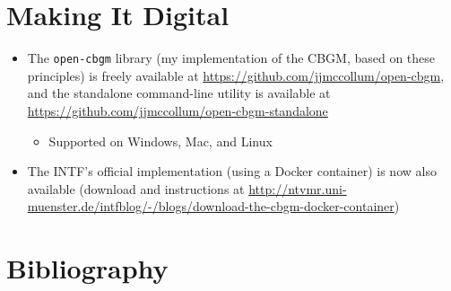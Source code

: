 \documentclass[10pt]{beamer}
\begin{document}
	\section*{Making It Digital}
	\begin{frame}
		\begin{itemize}
			\item The \texttt{open-cbgm} library (my implementation of the CBGM, based on these principles) is freely available at \url{https://github.com/jjmccollum/open-cbgm}, and the standalone command-line utility is available at \url{https://github.com/jjmccollum/open-cbgm-standalone}
			\begin{itemize}
				\item Supported on Windows, Mac, and Linux
			\end{itemize}
			\item The INTF's official implementation (using a Docker container) is now also available (download and instructions at \url{http://ntvmr.uni-muenster.de/intfblog/-/blogs/download-the-cbgm-docker-container})
		\end{itemize}
	\end{frame}
	\section*{Bibliography}
	\begin{frame}[allowframebreaks]
		\printbibliography
	\end{frame}
\end{document}
